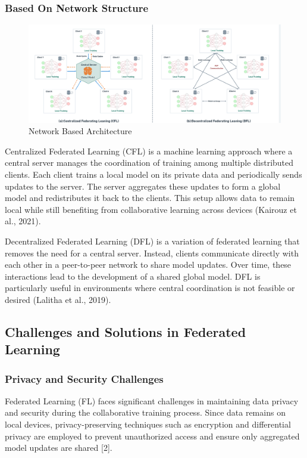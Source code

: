 \subsubsection{Based On Network Structure}

\begin{figure}[H]
    \centering
    \includegraphics[width=1\linewidth]{Figures/network_based.png}
    \caption{Network Based Architecture}
    \label{fig:enter-label}
\end{figure}

Centralized Federated Learning (CFL) is a machine learning approach where a central server manages the coordination of training among multiple distributed clients. Each client trains a local model on its private data and periodically sends updates to the server. The server aggregates these updates to form a global model and redistributes it back to the clients. This setup allows data to remain local while still benefiting from collaborative learning across devices (Kairouz et al., 2021).

Decentralized Federated Learning (DFL) is a variation of federated learning that removes the need for a central server. Instead, clients communicate directly with each other in a peer-to-peer network to share model updates. Over time, these interactions lead to the development of a shared global model. DFL is particularly useful in environments where central coordination is not feasible or desired (Lalitha et al., 2019).

\subsection{Challenges and Solutions in Federated Learning}
\subsubsection{Privacy and Security Challenges}

Federated Learning (FL) faces significant challenges in maintaining data privacy and security during the collaborative training process. Since data remains on local devices, privacy-preserving techniques  such as encryption and differential privacy  are employed to prevent unauthorized access and ensure only aggregated model updates are shared [2].

